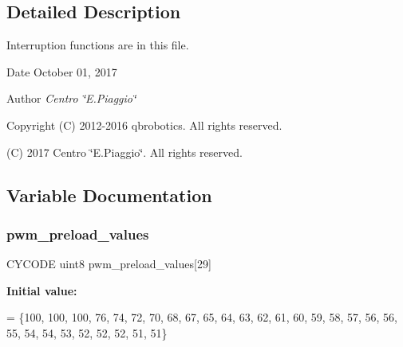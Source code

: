 \subsection{Detailed Description}
Interruption functions are in this file. 

\begin{DoxyDate}{Date}
October 01, 2017 
\end{DoxyDate}
\begin{DoxyAuthor}{Author}
{\itshape Centro \char`\"{}\+E.\+Piaggio\char`\"{}} 
\end{DoxyAuthor}
\begin{DoxyCopyright}{Copyright}
(C) 2012-\/2016 qbrobotics. All rights reserved. 

(C) 2017 Centro \char`\"{}\+E.\+Piaggio\char`\"{}. All rights reserved. 
\end{DoxyCopyright}


\subsection{Variable Documentation}
\mbox{\label{interruptions_8c_a82beecb0593499956eb3ee6fdf734a76}} 
\subsubsection{pwm\+\_\+preload\+\_\+values}
{\footnotesize\ttfamily C\+Y\+C\+O\+DE uint8 pwm\+\_\+preload\+\_\+values[29]}

{\bfseries Initial value\+:}
\begin{DoxyCode}
= \{100,    
                                             100,
                                             100,
                                              76,
                                              74,
                                              72,    
                                              70,
                                              68,
                                              67,
                                              65,
                                              64,    
                                              63,
                                              62,
                                              61,
                                              60,
                                              59,    
                                              58,
                                              57,
                                              56,
                                              56,
                                              55,    
                                              54,
                                              54,
                                              53,
                                              52,
                                              52,    
                                              52,
                                              51,
                                              51\}
\end{DoxyCode}
